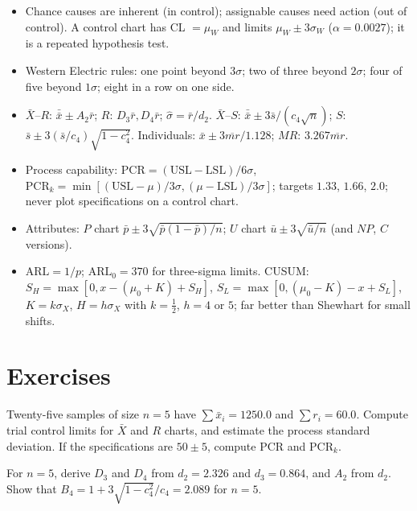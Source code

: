 \begin{summarybox}
\begin{itemize}
  \item Chance causes are inherent (in control); assignable causes need action (out of control). A control chart has CL $=\mu_W$ and limits $\mu_W\pm3\sigma_W$ ($\alpha=0.0027$); it is a repeated hypothesis test.
  \item Western Electric rules: one point beyond $3\sigma$; two of three beyond $2\sigma$; four of five beyond $1\sigma$; eight in a row on one side.
  \item $\bar{X}$--$R$: $\bar{\bar{x}}\pm A_2\bar{r}$; $R$: $D_3\bar{r},D_4\bar{r}$; $\hat\sigma=\bar{r}/d_2$. $\bar{X}$--$S$: $\bar{\bar{x}}\pm3\bar{s}/(c_4\sqrt n)$; $S$: $\bar{s}\pm3(\bar{s}/c_4)\sqrt{1-c_4^2}$. Individuals: $\bar{x}\pm3\overline{mr}/1.128$; $MR$: $3.267\overline{mr}$.
  \item Process capability: $\mathrm{PCR}=(\mathrm{USL}-\mathrm{LSL})/6\sigma$, $\mathrm{PCR}_k=\min[(\mathrm{USL}-\mu)/3\sigma,(\mu-\mathrm{LSL})/3\sigma]$; targets $1.33$, $1.66$, $2.0$; never plot specifications on a control chart.
  \item Attributes: $P$ chart $\bar{p}\pm3\sqrt{\bar{p}(1-\bar{p})/n}$; $U$ chart $\bar{u}\pm3\sqrt{\bar{u}/n}$ (and $NP$, $C$ versions).
  \item $\mathrm{ARL}=1/p$; $\mathrm{ARL}_0=370$ for three-sigma limits. CUSUM: $S_H=\max[0,x-(\mu_0+K)+S_H]$, $S_L=\max[0,(\mu_0-K)-x+S_L]$, $K=k\sigma_X$, $H=h\sigma_X$ with $k=\frac12$, $h=4$ or $5$; far better than Shewhart for small shifts.
\end{itemize}
\end{summarybox}

\section{Exercises}

\begin{exercise}
Twenty-five samples of size $n=5$ have $\sum\bar{x}_i=1250.0$ and $\sum r_i=60.0$. Compute trial control limits for $\bar{X}$ and $R$ charts, and estimate the process standard deviation. If the specifications are $50\pm5$, compute PCR and PCR$_k$.
\end{exercise}

\begin{exercise}
For $n=5$, derive $D_3$ and $D_4$ from $d_2=2.326$ and $d_3=0.864$, and $A_2$ from $d_2$. Show that $B_4=1+3\sqrt{1-c_4^2}/c_4=2.089$ for $n=5$.
\end{exercise}

